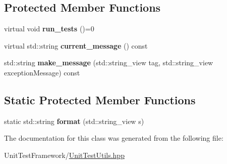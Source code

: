 \subsection*{Protected Member Functions}
\begin{DoxyCompactItemize}
\item 
\mbox{\label{classsequoia_1_1unit__testing_1_1basic__test_acce2ade43fd6817e250a048397fdd3d2}} 
virtual void {\bfseries run\+\_\+tests} ()=0
\item 
\mbox{\label{classsequoia_1_1unit__testing_1_1basic__test_ad3ae25cefe20dc3a51fcf9d00668692c}} 
virtual std\+::string {\bfseries current\+\_\+message} () const
\item 
\mbox{\label{classsequoia_1_1unit__testing_1_1basic__test_a246824e0d34fa3b659ea0a077b287853}} 
std\+::string {\bfseries make\+\_\+message} (std\+::string\+\_\+view tag, std\+::string\+\_\+view exception\+Message) const
\end{DoxyCompactItemize}
\subsection*{Static Protected Member Functions}
\begin{DoxyCompactItemize}
\item 
\mbox{\label{classsequoia_1_1unit__testing_1_1basic__test_a77a5f7c2d42b16f972e88149f029e007}} 
static std\+::string {\bfseries format} (std\+::string\+\_\+view s)
\end{DoxyCompactItemize}


The documentation for this class was generated from the following file\+:\begin{DoxyCompactItemize}
\item 
Unit\+Test\+Framework/\mbox{\hyperlink{_unit_test_utils_8hpp}{Unit\+Test\+Utils.\+hpp}}\end{DoxyCompactItemize}

